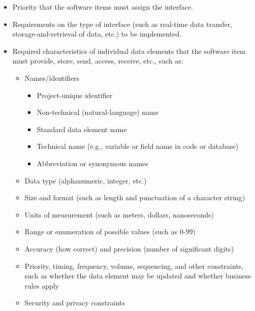 \begin{itemize}
\item Priority that the software items must assign the interface.

\item Requirements on the type of interface (such as real-time data transfer, storage-and-retrieval of data, etc.) to be implemented.

\item Required characteristics of individual data elements that the software item must provide, store, send, access, receive, etc., such as:

\begin{itemize}
\item Names/identifiers

\begin{itemize}
\item Project-unique identifier

\item Non-technical (natural-language) name

\item Standard data element name

\item Technical name (e.g., variable or field name in code or database)

\item Abbreviation or synonymous names

\end{itemize}
\item Data type (alphanumeric, integer, etc.)

\item Size and format (such as length and punctuation of a character string)

\item Units of measurement (such as meters, dollars, nanoseconds)

\item Range or enumeration of possible values (such as 0-99)

\item Accuracy (how correct) and precision (number of significant digits)

\item Priority, timing, frequency, volume, sequencing, and other constraints, such as whether the data element may be updated and whether business rules apply

\item Security and privacy constraints


\end{itemize}
\end{itemize}
